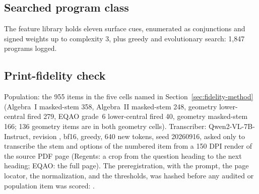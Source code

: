 \subsection{Searched program class}
\label{app:searched}

The feature library holds eleven surface cues, enumerated as conjunctions and signed weights up to complexity 3, plus greedy and evolutionary search: 1{,}847 programs logged.

\subsection{Print-fidelity check}
\label{app:fidelity}

Population: the 955 items in the five cells named in Section~\ref{sec:fidelity-method} (Algebra~I masked-stem 358, Algebra~II masked-stem 248, geometry lower-central fired 279, EQAO grade~6 lower-central fired 40, geometry masked-stem 166; 136 geometry items are in both geometry cells). Transcriber: Qwen2-VL-7B-Instruct, revision , bf16, greedy, 640 new tokens, seed 20260916, asked only to transcribe the stem and options of the numbered item from a 150 DPI render of the source PDF page (Regents: a crop from the question heading to the next heading; EQAO: the full page). The preregistration, with the prompt, the page locator, the normalization, and the thresholds, was hashed before any audited or population item was scored:
.

